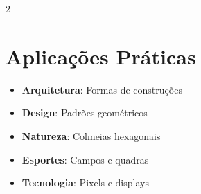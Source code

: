 \documentclass[11pt]{article}
\begin{document}
\begin{multicols}{2}
\section*{Aplicações Práticas}

\begin{itemize}
\item \textbf{Arquitetura}: Formas de construções
\item \textbf{Design}: Padrões geométricos
\item \textbf{Natureza}: Colmeias hexagonais
\item \textbf{Esportes}: Campos e quadras
\item \textbf{Tecnologia}: Pixels e displays
\end{itemize}

\end{multicols}
\end{document}
